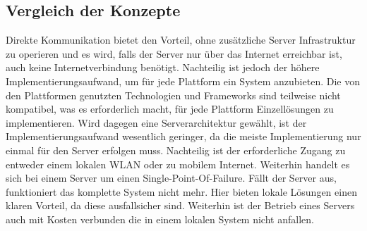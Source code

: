 \subsection{Vergleich der Konzepte}
\label{sec:Systemvergleich}
Direkte Kommunikation bietet den Vorteil, ohne zusätzliche Server Infrastruktur zu operieren und es wird, falls der Server nur über das Internet erreichbar ist, auch keine Internetverbindung benötigt. Nachteilig ist jedoch der höhere Implementierungsaufwand, um für jede Plattform ein System anzubieten. Die von den Plattformen genutzten Technologien und Frameworks sind teilweise nicht kompatibel, was es erforderlich macht, für jede Plattform Einzellösungen zu implementieren. Wird dagegen eine Serverarchitektur gewählt, ist der Implementierungsaufwand wesentlich geringer, da die meiste Implementierung nur einmal für den Server erfolgen muss. Nachteilig ist der erforderliche Zugang zu entweder einem lokalen \ac{WLAN} oder zu mobilem Internet. Weiterhin handelt es sich bei einem Server um einen Single-Point-Of-Failure. Fällt der Server aus, funktioniert das komplette System nicht mehr. Hier bieten lokale Lösungen einen klaren Vorteil, da diese ausfallsicher sind. Weiterhin ist der Betrieb eines Servers auch mit Kosten verbunden die in einem lokalen System nicht anfallen.